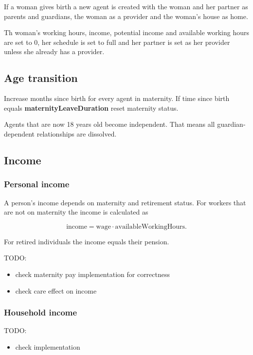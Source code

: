 \documentclass{article}
\newcommand{\marginnote}[1]{\protect\marginpar{\small\texttt{#1}}}
\begin{document}
If a woman gives birth a new agent is created with the woman and
her partner as parents and guardians, the woman as a provider and the woman's house as home. 

Th woman's working hours, income, potential income and available working hours are set to 0, her schedule is set to full and her partner is set as her provider unless she already has a provider.


\subsection{Age transition \marginnote{Age.jl}}
Increase months since birth for every agent in maternity. If time since
birth equals \textbf{maternityLeaveDuration} reset maternity status. 

Agents that are now 18 years old become independent. That means all guardian-dependent relationships are dissolved.


\subsection{Income \marginnote{Income.jl}}

\subsubsection*{Personal income}

A person's income depends on maternity and retirement status. For workers that are not on maternity the income is calculated as

\[
\mathrm{income} = \mathrm{wage} \cdot \mathrm{availableWorkingHours}.
\]

For retired individuals the income equals their \textsf{pension}.

TODO: 
\begin{itemize}
\item check maternity pay implementation for correctness
\item check care effect on income
\end{itemize}

\subsubsection*{Household income}

TODO: 
\begin{itemize}
\item check implementation
\end{itemize}
\end{document}
